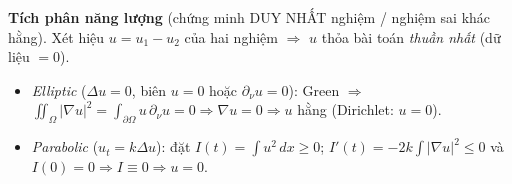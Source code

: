 \textbf{Tích phân năng lượng} (chứng minh DUY NHẤT nghiệm / nghiệm sai khác hằng).
Xét hiệu $u=u_1-u_2$ của hai nghiệm $\Rightarrow$ $u$ thỏa bài toán \emph{thuần nhất} (dữ liệu $=0$).
\begin{itemize}
  \item \emph{Elliptic} ($\Delta u=0$, biên $u=0$ hoặc $\partial_\nu u=0$): Green $\Rightarrow$
  $\iint_\Omega|\nabla u|^2=\int_{\partial\Omega}u\,\partial_\nu u=0\Rightarrow \nabla u=0\Rightarrow u$ hằng (Dirichlet: $u=0$).
  \item \emph{Parabolic} ($u_t=k\Delta u$): đặt $I(t)=\int u^2\,dx\ge0$; $I'(t)=-2k\int|\nabla u|^2\le0$ và $I(0)=0\Rightarrow I\equiv0\Rightarrow u=0$.
\end{itemize}
